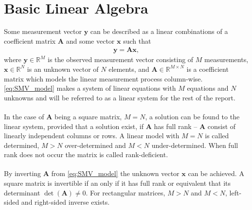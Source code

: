 \section{Basic Linear Algebra}
Some measurement vector $\mathbf{y}$ can be described as a linear combinations of a coefficient matrix $\mathbf{A}$ and some vector $\mathbf{x}$ such that
\begin{align}\label{eq:SMV_model}
\mathbf{y} = \mathbf{Ax},
\end{align}
where $\mathbf{y} \in \mathbb{R}^M$ is the observed measurement vector consisting of $M$ measurements, $\mathbf{x} \in \mathbb{R}^N$ is an unknown vector of $N$ elements, and $\mathbf{A} \in \mathbb{R}^{M \times N}$ is a coefficient matrix which models the linear measurement process column-wise. 
\ref{eq:SMV_model} makes a system of linear equations with $M$ equations and $N$ unknowns and will be referred to as a linear system for the rest of the report.
\\ \\
In the case of $\mathbf{A}$ being a square matrix, $M = N$, a solution can be found to the linear system, provided that a solution exist, if $\mathbf{A}$ has full rank -- $\mathbf{A}$ consist of linearly independent columns or rows.
A linear model with $M = N$ is called determined, $M > N$ over-determined and $M < N$ under-determined. 
When full rank does not occur the matrix is called rank-deficient.
\\ \\
By inverting $\mathbf{A}$ from \eqref{eq:SMV_model} the unknown vector $\mathbf{x}$ can be achieved. 
A square matrix is invertible if an only if it has full rank or equivalent that its determinant $\det(\mathbf{A}) \neq 0$. 
For rectangular matrices, $M > N$ and $M < N$, left-sided and right-sided inverse exists.
